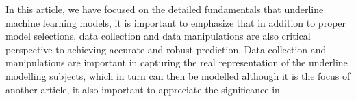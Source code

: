 
\par
In this article, we have focused on the detailed fundamentals that underline machine learning models, it is important to emphasize that in addition to proper model selections, data collection and data manipulations are also critical perspective to achieving accurate and robust prediction. Data collection and manipulations are important in capturing the real representation of the underline modelling subjects, which in turn can then be modelled  although it is the focus of another article, it also important to appreciate the significance in 
\par 
